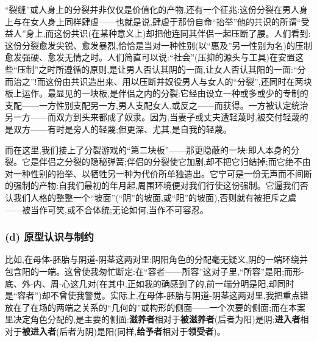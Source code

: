 “裂缝”或人身上的分裂并非仅仅是价值化的产物,还有一个征兆:这份分裂在男人身上与在女人身上同样肆虐——也就是说,肆虐于那份自命“抬举”他的共识的所谓“受益人”身上,而这份共识(在某种意义上)却把他连同其伴侣一起压断了腰。人们看到:这份分裂愈发尖锐、愈发暴烈,恰恰是当对一种性别(以“惠及”另一性别为名)的压制愈发强硬、愈发无情之时。人们简直可以说:“社会”(压抑的源头与工具)在安置这些“压制”之时所遵循的原则,是让男人否认其阴的一面,让女人否认其阳的一面:“分而治之”!而这份由共识造出来、用以压断并奴役男人与女人的“分裂”,还同时在两块板上运作。最显见的一块板,是伴侣之内的分裂:它经由设立一种或多或少的专制的支配——一方性别支配另一方,男人支配女人,或反之——而获得。一方被认定统治另一方——而双方到头来都成了奴隶。因为,当妻子或丈夫遭轻蔑时,被交付轻蔑的是双方——有时是旁人的轻蔑;但更深、尤其,是自我的轻蔑。

而在这里,我们接上了分裂游戏的“第二块板”——那更隐蔽的一块:即人本身的分裂。它是伴侣之分裂的隐秘弹簧;伴侣的分裂使它加剧,却不把它归结掉;而它绝不由对一种性别的抬举、以牺牲另一种为代价所单独造出。它宁可是一份无声而不间断的强制的产物:自我们最初的年月起,周围环境便对我们行使这份强制。它逼我们否认我们人格的整整一个“坡面”(“阴”的坡面,或“阳”的坡面),否则就有被拒斥之虞——被当作可笑,或不合体统;无论如何,当作不可容忍。

\subsubsection*{(d) 原型认识与制约}
\label{ch18:local:h15}

\label{ch18:local:n14}

比如,在母体-胚胎与阴道-阴茎这两对里:阴阳角色的分配毫无疑义,阴的一端环绕并包含阳的一端。这曾使我匆忙断定:在“容者——所容”这对子里,“所容”是阳;而形-底、外-内、周-心这几对(在其中,正如我的确感到了的,前一端分明是阳,却同时是“容者”)却不曾使我警觉。实际上,在母体-胚胎与阴道-阴茎这两对里,我把重点错放在了在场的两端之关系的“几何的”或构形的侧面——一个次要的侧面;而在本案里决定角色分配的,是主要的侧面:\textbf{滋养者}相对于\textbf{被滋养者}(后者为阳)是阴;\textbf{进入者}相对于\textbf{被进入者}(后者为阴)是阳(同样,\textbf{给予者}相对于\textbf{领受者})。

